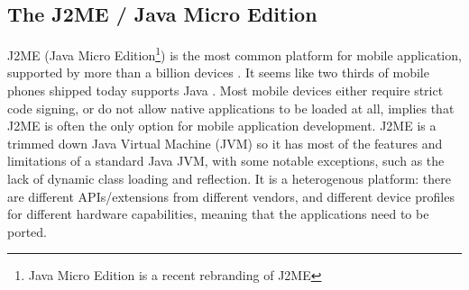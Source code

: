 \documentclass[11pt]{report}
\begin{document}
%
%

\subsection{The J2ME / Java Micro Edition}

J2ME (Java Micro Edition\footnote{Java Micro Edition is a recent rebranding of J2ME}) is the most common platform for mobile application, supported by more than a billion devices \cite{sun-j2me}. 
It seems like two thirds of mobile phones shipped today supports Java \cite{esmertec-globenews}.
Most mobile devices either require strict code signing, or do not allow native applications to be loaded at all, implies that J2ME is often the only option for mobile application development.
J2ME is a trimmed down Java Virtual Machine (JVM) so it has most of the features and limitations of a standard Java JVM, with some notable exceptions, such as the lack of dynamic class loading and reflection. It is a heterogenous platform:
there are different APIs/extensions from different vendors, and different device profiles for different hardware capabilities, meaning that the applications need to be ported.
\end{document}
